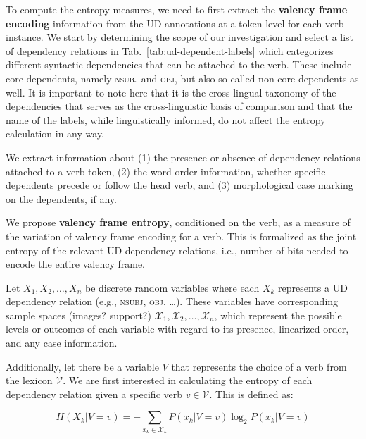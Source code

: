 To compute the entropy measures, we need to first extract the \textbf{valency frame encoding} information from the UD annotations at a token level for each verb instance. We start by determining the scope of our investigation and select a list of dependency relations in Tab.~\ref{tab:ud-dependent-labels} which categorizes different syntactic dependencies that can be attached to the verb. These include core dependents, namely \textsc{nsubj} and \textsc{obj}, but also so-called non-core dependents as well.  It is important to note here that it is the cross-lingual taxonomy of the dependencies that serves as the cross-linguistic basis of comparison and that the name of the labels, while linguistically informed, do not affect the entropy calculation in any way.

We extract information about (1) the presence or absence of dependency relations attached to a verb token, (2) the word order information, whether specific dependents precede or follow the head verb, and (3) morphological case marking on the dependents, if any.


We propose \textbf{valency frame entropy}, conditioned on the verb, as a measure of the variation of valency frame encoding for a verb. This is formalized as the joint entropy of the relevant UD dependency relations, i.e., number of bits needed to encode the entire valency frame.

Let $X_1, X_2,\ldots,X_n$ be discrete random variables where each $X_k$ represents a UD dependency relation (e.g., \textsc{nsubj}, \textsc{obj}, \ldots). These variables have corresponding sample spaces (images? support?) $\mathcal{X}_1, \mathcal{X}_2, \ldots, \mathcal{X}_n$, which represent the possible levels or outcomes of each variable with regard to its presence, linearized order, and any case information.

Additionally, let there be a variable $V$ that represents the choice of a verb from the lexicon $\mathcal{V}$. We are first interested in calculating the entropy of each dependency relation given a specific verb $v \in \mathcal{V}$. This is defined as:

\begin{equation*}
  H(X_{k}|V=v)=
  -\sum\limits_{x_{k}\in{}\mathcal{X}_{k}}{P(x_{k}|V=v)\log_{2}{P(x_{k}|V=v)}}  
\end{equation*}

